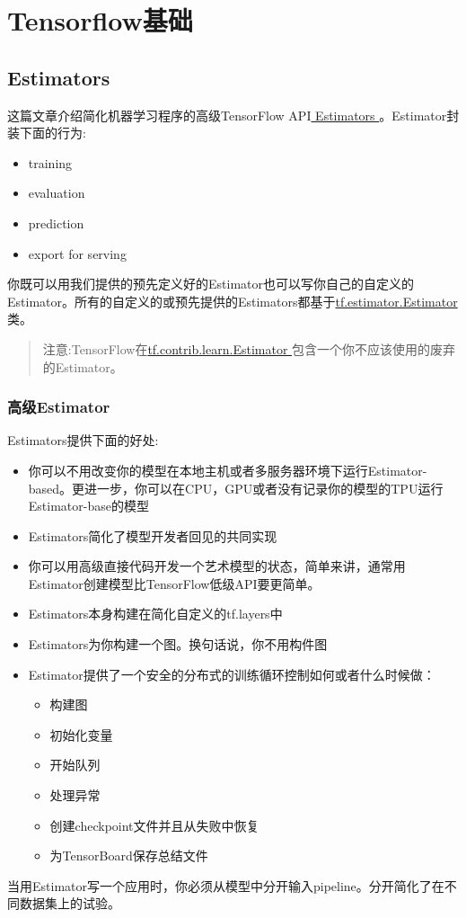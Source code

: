 \chapter{Tensorflow基础}
\section{Estimators}
这篇文章介绍简化机器学习程序的高级TensorFlow API\href{https://www.tensorflow.org/api_docs/python/tf/estimator?hl=zh-cn}{ Estimators }。Estimator封装下面的行为:
\begin{itemize}
\item training
\item evaluation
\item prediction
\item export for serving
\end{itemize}
你既可以用我们提供的预先定义好的Estimator也可以写你自己的自定义的Estimator。所有的自定义的或预先提供的Estimators都基于\href{https://www.tensorflow.org/api_docs/python/tf/estimator/Estimator?hl=zh-cn}{tf.estimator.Estimator}类。
\begin{quote}
注意:TensorFlow在\href{https://www.tensorflow.org/api_docs/python/tf/contrib/learn/Estimator?hl=zh-cn}{tf.contrib.learn.Estimator }包含一个你不应该使用的废弃的Estimator。
\end{quote}
\subsection{高级Estimator}
Estimators提供下面的好处:
\begin{itemize}
\item 你可以不用改变你的模型在本地主机或者多服务器环境下运行Estimator-based。更进一步，你可以在CPU，GPU或者没有记录你的模型的TPU运行Estimator-base的模型
\item Estimators简化了模型开发者回见的共同实现
\item 你可以用高级直接代码开发一个艺术模型的状态，简单来讲，通常用Estimator创建模型比TensorFlow低级API要更简单。
\item Estimators本身构建在简化自定义的tf.layers中
\item Estimators为你构建一个图。换句话说，你不用构件图
\item Estimator提供了一个安全的分布式的训练循环控制如何或者什么时候做：
\begin{itemize}
\item 构建图
\item 初始化变量
\item 开始队列
\item 处理异常
\item 创建checkpoint文件并且从失败中恢复
\item 为TensorBoard保存总结文件
\end{itemize}
\end{itemize}
当用Estimator写一个应用时，你必须从模型中分开输入pipeline。分开简化了在不同数据集上的试验。
